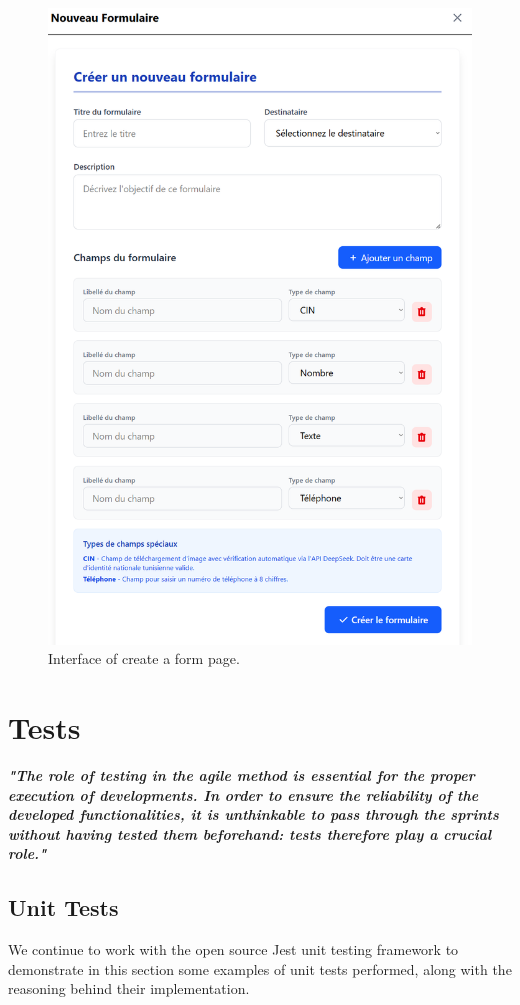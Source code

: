 \begin{figure}[h!]
    \centering
    \includegraphics[width=1\textwidth]{figures/ui-createform.png}
    \caption{Interface of create a form page.}
\end{figure}
\clearpage
\section{Tests}
\textbf{\textit{"The role of testing in the agile method is essential for the proper execution of developments. In order to ensure the reliability of the developed functionalities, it is unthinkable to pass through the sprints without having tested them beforehand: tests therefore play a crucial role."\cite{samplewebs7}}}
\subsection{Unit Tests}
We continue to work with the open source Jest unit testing framework to demonstrate in this section some examples of unit tests performed, along with the reasoning behind their implementation.
